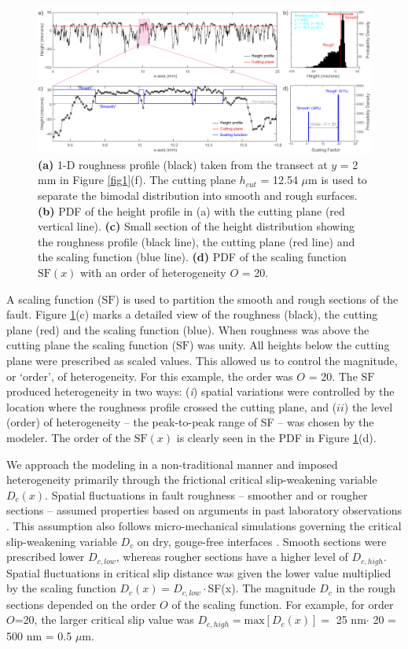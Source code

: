 \documentclass[preprint,1p, 10pt,authoryear]{elsarticle}
\begin{document}
\begin{figure}[ht]
	\centering
	\includegraphics{FIG3_revised.pdf} 
	\caption{ \textbf{(a)} 1-D roughness profile (black) taken from the transect at $y$ = 2 mm in Figure \ref{fig1}(f).  The cutting plane $h_{cut}$ = 12.54 $\mu$m is used to separate the bimodal distribution into smooth and rough surfaces. \textbf{(b)} PDF of the height profile in (a) with the cutting plane (red vertical line). \textbf{(c)} Small section of the height distribution showing the roughness profile (black line), the cutting plane (red line) and the scaling function (blue line). \textbf{(d)} PDF of the scaling function $\mathrm{SF}(x)$ with an order of heterogeneity $O$ = 20.}
	\label{fig3}
\end{figure}

A scaling function ($\mathrm{SF}$) is used to partition the smooth and rough sections of the fault. Figure \ref{fig3}(c) marks a detailed view of the roughness (black), the cutting plane (red) and the scaling function (blue). When roughness was above the cutting plane the scaling function ($\mathrm{SF}$) was unity. All heights below the cutting plane were prescribed as scaled values. This allowed us to control the magnitude, or `order', of heterogeneity. For this example, the order was $O$ = 20. The  $\mathrm{SF}$ produced heterogeneity in two ways: (\textit{i}) spatial variations were controlled by the location where the roughness profile crossed the cutting plane, and ($ii$) the level (order) of heterogeneity -- the peak-to-peak range of SF -- was chosen by the modeler. The order of the $\mathrm{SF}(x)$ is clearly seen in the PDF in Figure \ref{fig3}(d).

We approach the modeling in a non-traditional manner and imposed heterogeneity primarily through the frictional critical slip-weakening variable $D_{c}(x)$. Spatial fluctuations in fault roughness -- smoother and or rougher sections -- assumed properties based on arguments in past laboratory observations \citep{Marone1994}. This assumption also follows micro-mechanical simulations governing the critical slip-weakening variable $D_{c}$ on dry, gouge-free interfaces \citep{Yoshioka1996,Yoshioka1997}. Smooth sections were prescribed lower $D_{c,low}$, whereas rougher sections have a higher level of $D_{c, high}$. Spatial fluctuations in critical slip distance was given the lower value multiplied by the scaling function $D_{c}(x) = D_{c,low}\cdot$SF(x). The magnitude $D_{c}$ in the rough sections depended on the order $O$ of the scaling function. For example, for order $O$=20, the larger critical slip value was $D_{c, high} = \textrm{max}[D_{c}(x)] =$ 25 nm$\cdot$ 20 = 500 nm = 0.5 $\mu$m. 
\end{document}
